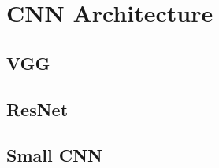 \chapter{CNN Architecture} 
\label{arcgutecture} 

\section{VGG}
\section{ResNet}
\section{Small CNN}
